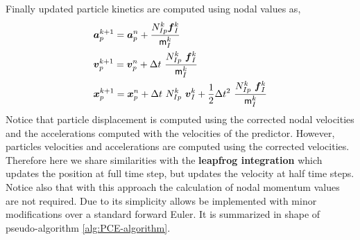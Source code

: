 Finally updated particle kinetics are computed using nodal values as,
\begin{align}
  \label{eq:Update-lagrangian-pce}
        &\vec{a}_p^{k+1} = \vec{a}_p^n +
        \frac{N_{Ip}^k\vec{f}_{I}^{k}}{\tens{m}_I^k}\\
      &\vec{v}_p^{k+1} = \vec{v}_p^n + \Delta t\
        \frac{N_{Ip}^k\
        \vec{f}_{I}^{k}}{\tens{m}_I^k}\\
      &\vec{x}_p^{k+1} = \vec{x}_p^n + \Delta t\
         N_{Ip}^k\ \vec{v}_{I}^{k} +
        \frac{1}{2}\Delta t^2\ \frac{N_{Ip}^k\
        \vec{f}_{I}^{k}}{\tens{m}_I^k} 
\end{align}
Notice that particle displacement is computed using the corrected
nodal velocities and the accelerations computed with the velocities
of the predictor. However, particles velocities and accelerations
are computed using the corrected velocities. Therefore here we share similarities
with the \textbf{leapfrog integration} which updates the position at
full time step, but updates the velocity at half time steps. Notice
also that with this approach the calculation of nodal momentum values
are not required. Due to its simplicity allows be implemented with minor modifications
over a standard forward Euler. It is summarized in shape of
pseudo-algorithm \ref{alg:PCE-algorithm}.

